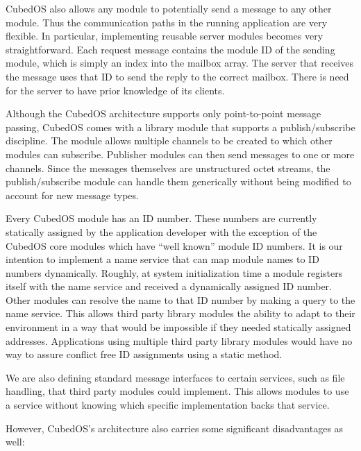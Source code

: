 CubedOS also allows any module to potentially send a message to any other module. Thus the
communication paths in the running application are very flexible. In particular, implementing
reusable server modules becomes very straightforward. Each request message contains the module
ID of the sending module, which is simply an index into the mailbox array. The server that
receives the message uses that ID to send the reply to the correct mailbox. There is need for
the server to have prior knowledge of its clients.

Although the CubedOS architecture supports only point-to-point message passing, CubedOS comes
with a library module that supports a publish/subscribe discipline. The module allows multiple
channels to be created to which other modules can subscribe. Publisher modules can then send
messages to one or more channels. Since the messages themselves are unstructured octet streams,
the publish/subscribe module can handle them generically without being modified to account for
new message types.

Every CubedOS module has an ID number. These numbers are currently statically assigned by the
application developer with the exception of the CubedOS core modules which have ``well known''
module ID numbers. It is our intention to implement a name service that can map module names to
ID numbers dynamically. Roughly, at system initialization time a module registers itself with
the name service and received a dynamically assigned ID number. Other modules can resolve the
name to that ID number by making a query to the name service. This allows third party library
modules the ability to adapt to their environment in a way that would be impossible if they
needed statically assigned addresses. Applications using multiple third party library modules
would have no way to assure conflict free ID assignments using a static method.

We are also defining standard message interfaces to certain services, such as file handling,
that third party modules could implement. This allows modules to use a service without knowing
which specific implementation backs that service.

However, CubedOS's architecture also carries some significant disadvantages as well:

